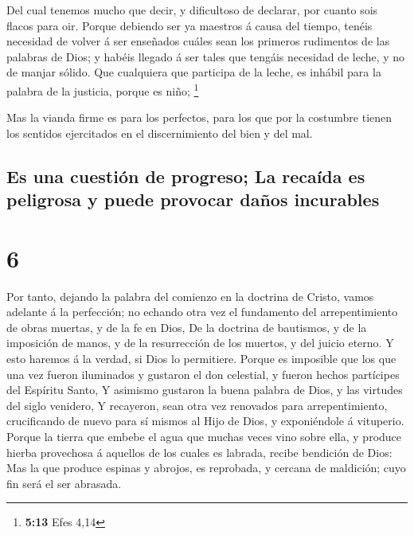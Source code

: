  Del cual tenemos mucho que decir, y dificultoso de
declarar, por cuanto sois flacos para oir.  Porque debiendo
ser ya maestros á causa del tiempo, tenéis necesidad de volver á ser
enseñados cuáles sean los primeros rudimentos de las palabras de Dios; y
habéis llegado á ser tales que tengáis necesidad de leche, y no de
manjar sólido.  Que cualquiera que participa de la leche,
es inhábil para la palabra de la justicia, porque es niño; \footnote{\textbf{5:13}
  Efes 4,14}

 Mas la vianda firme es para los perfectos, para los que
por la costumbre tienen los sentidos ejercitados en el discernimiento
del bien y del mal.

\hypertarget{es-una-cuestiuxf3n-de-progreso-la-recauxedda-es-peligrosa-y-puede-provocar-dauxf1os-incurables}{%
\subsection{Es una cuestión de progreso; La recaída es peligrosa y puede
provocar daños
incurables}\label{es-una-cuestiuxf3n-de-progreso-la-recauxedda-es-peligrosa-y-puede-provocar-dauxf1os-incurables}}

\hypertarget{section-5}{%
\section{6}\label{section-5}}

 Por tanto, dejando la palabra del comienzo en la doctrina
de Cristo, vamos adelante á la perfección; no echando otra vez el
fundamento del arrepentimiento de obras muertas, y de la fe en Dios,
 De la doctrina de bautismos, y de la imposición de manos, y
de la resurrección de los muertos, y del juicio eterno.  Y
esto haremos á la verdad, si Dios lo permitiere.  Porque es
imposible que los que una vez fueron iluminados y gustaron el don
celestial, y fueron hechos partícipes del Espíritu Santo,  Y
asimismo gustaron la buena palabra de Dios, y las virtudes del siglo
venidero,  Y recayeron, sean otra vez renovados para
arrepentimiento, crucificando de nuevo para sí mismos al Hijo de Dios, y
exponiéndole á vituperio.  Porque la tierra que embebe el
agua que muchas veces vino sobre ella, y produce hierba provechosa á
aquellos de los cuales es labrada, recibe bendición de Dios:
 Mas la que produce espinas y abrojos, es reprobada, y
cercana de maldición; cuyo fin será el ser abrasada.

